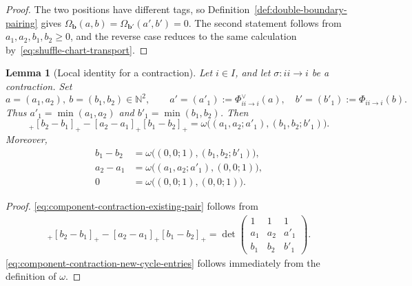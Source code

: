 \documentclass[10pt,a4paper]{article}
\newtheorem{lemma}[theorem]{Lemma}
\theoremstyle{definition}
\theoremstyle{remark}
\begin{document}
\begin{proof}
The two positions have different tags, so
Definition~\ref{def:double-boundary-pairing} gives
\(\Omega_{\mathbf b}(a,b)=\Omega_{\mathbf b'}(a',b')=0\).  The second
statement follows from \(a_1,a_2,b_1,b_2\ge0\), and the reverse case reduces
to the same calculation by~\eqref{eq:shuffle-chart-transport}.
\end{proof}

\begin{lemma}[Local identity for a contraction]
\label{lem:component-contraction-finite-identity}
Let \(i\in I\), and let \(\sigma:ii\to i\) be a contraction.  Set
\[
 a=(a_1,a_2),\ b=(b_1,b_2)\in\mathbb N^2,
 \qquad
 a'=(a'_1):=\Phi_{ii\to i}^\vee(a),
 \quad
 b'=(b'_1):=\Phi_{ii\to i}(b).
\]
Thus \(a'_1=\min(a_1,a_2)\) and \(b'_1=\min(b_1,b_2)\).  Then
\begin{equation}
 [a_1-a_2]_+[b_2-b_1]_+
 -[a_2-a_1]_+[b_1-b_2]_+
 =\omega\bigl((a_1,a_2;a'_1),(b_1,b_2;b'_1)\bigr).
 \label{eq:component-contraction-existing-pair}
\end{equation}
Moreover,
\begin{equation}
 \begin{aligned}
  b_1-b_2&=\omega\bigl((0,0;1),(b_1,b_2;b'_1)\bigr),\\
  a_2-a_1&=\omega\bigl((a_1,a_2;a'_1),(0,0;1)\bigr),\\
  0&=\omega\bigl((0,0;1),(0,0;1)\bigr).
 \end{aligned}
 \label{eq:component-contraction-new-cycle-entries}
\end{equation}
\end{lemma}

\begin{proof}
\eqref{eq:component-contraction-existing-pair} follows from
\begin{align*}
 [a_1-a_2]_+[b_2-b_1]_+
   -[a_2-a_1]_+[b_1-b_2]_+
 = \det\!\begin{pmatrix}
  1&1&1\\ a_1&a_2&a'_1\\ b_1&b_2&b'_1
 \end{pmatrix}.
\end{align*}
\eqref{eq:component-contraction-new-cycle-entries} follows immediately
from the definition of \(\omega\).
\end{proof}
\end{document}
